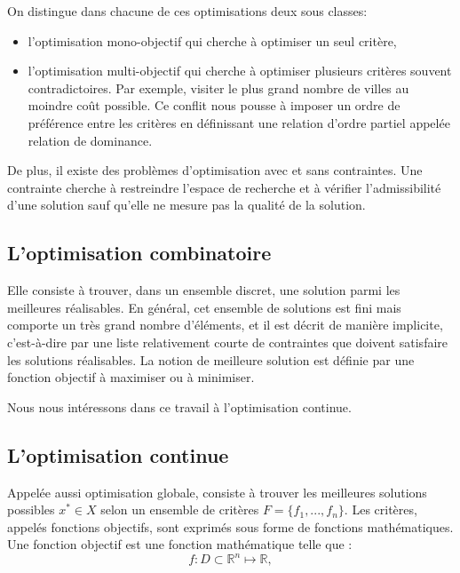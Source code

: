 On distingue dans chacune de ces optimisations deux sous classes:
\begin{itemize}
	\item l'optimisation mono-objectif qui cherche à optimiser un seul critère,
	\item l'optimisation multi-objectif qui cherche à optimiser plusieurs critères souvent contradictoires. Par exemple, visiter le plus grand nombre de villes au moindre coût possible. Ce conflit nous pousse à imposer un ordre de préférence entre les critères en définissant une relation d'ordre partiel appelée relation de dominance. 
\end{itemize}

De plus, il existe des problèmes d'optimisation avec et sans contraintes. Une contrainte cherche à restreindre l'espace de recherche et à vérifier l'admissibilité d'une solution sauf qu'elle ne mesure pas la qualité de la solution. 





\subsection{L'optimisation combinatoire}
Elle consiste à trouver, dans un ensemble discret, une solution parmi les meilleures réalisables. En général, cet ensemble de solutions est fini mais comporte un très grand nombre d'éléments, et il est décrit de manière implicite, c'est-à-dire par une liste  relativement courte de contraintes que doivent satisfaire les solutions réalisables. La notion de meilleure solution est définie par une fonction objectif à maximiser ou à minimiser.

\vspace{1em}

Nous nous intéressons dans ce travail à l'optimisation continue.
\subsection{L'optimisation continue}

Appelée aussi optimisation globale, consiste à trouver les meilleures solutions possibles $x^* \in X$ selon un ensemble de critères
$F = \{f_1,...,f_n\}$. Les critères, appelés fonctions objectifs, sont exprimés sous
forme de fonctions mathématiques. Une fonction objectif est une fonction mathématique
telle que :
$$f : D \subset \mathbb{R}^n \mapsto \mathbb{R},$$ 



